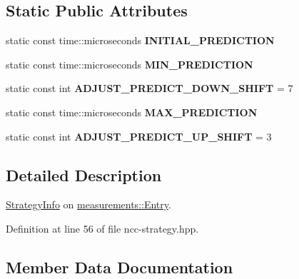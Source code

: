 \subsection*{Static Public Attributes}
\begin{DoxyCompactItemize}
\item 
static const time\+::microseconds {\bfseries I\+N\+I\+T\+I\+A\+L\+\_\+\+P\+R\+E\+D\+I\+C\+T\+I\+ON}
\item 
static const time\+::microseconds {\bfseries M\+I\+N\+\_\+\+P\+R\+E\+D\+I\+C\+T\+I\+ON}
\item 
static const int {\bfseries A\+D\+J\+U\+S\+T\+\_\+\+P\+R\+E\+D\+I\+C\+T\+\_\+\+D\+O\+W\+N\+\_\+\+S\+H\+I\+FT} = 7\hypertarget{classnfd_1_1fw_1_1NccStrategy_1_1MeasurementsEntryInfo_a5afc0e3a655a6f0591a4de183a95852b}{}\label{classnfd_1_1fw_1_1NccStrategy_1_1MeasurementsEntryInfo_a5afc0e3a655a6f0591a4de183a95852b}

\item 
static const time\+::microseconds {\bfseries M\+A\+X\+\_\+\+P\+R\+E\+D\+I\+C\+T\+I\+ON}
\item 
static const int {\bfseries A\+D\+J\+U\+S\+T\+\_\+\+P\+R\+E\+D\+I\+C\+T\+\_\+\+U\+P\+\_\+\+S\+H\+I\+FT} = 3\hypertarget{classnfd_1_1fw_1_1NccStrategy_1_1MeasurementsEntryInfo_a8099de318d85cd444a12ffd16b5d47cb}{}\label{classnfd_1_1fw_1_1NccStrategy_1_1MeasurementsEntryInfo_a8099de318d85cd444a12ffd16b5d47cb}

\end{DoxyCompactItemize}


\subsection{Detailed Description}
\hyperlink{classnfd_1_1fw_1_1StrategyInfo}{Strategy\+Info} on \hyperlink{classnfd_1_1measurements_1_1Entry}{measurements\+::\+Entry}. 

Definition at line 56 of file ncc-\/strategy.\+hpp.



\subsection{Member Data Documentation}
